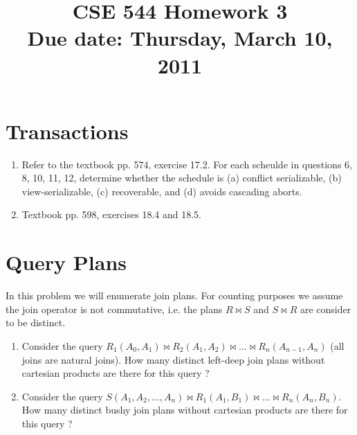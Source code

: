 \documentclass[12pt]{article}
\title{\bf CSE 544 Homework 3 \\
  Due date: Thursday, March 10, 2011}
\author{}
\date{}
\newcounter{query}
\begin{document}

\maketitle



\section{Transactions}

\begin{enumerate}

\item Refer to the textbook pp. 574, exercise 17.2.  For each scheulde
  in questions 6, 8, 10, 11, 12, determine whether the schedule is (a)
  conflict serializable, (b) view-serializable, (c) recoverable, and
  (d) avoids cascading aborts.

\item Textbook pp. 598, exercises 18.4 and 18.5.

\end{enumerate}


\section{Query Plans}

In this problem we will enumerate join plans.  For counting purposes
we assume the join operator is not commutative, i.e. the plans $R
\Join S$ and $S \Join R$ are consider to be distinct.
\begin{enumerate}
\item Consider the query $R_1(A_0,A_1) \Join R_2(A_1,A_2) \Join \ldots
  \Join R_n(A_{n-1},A_n)$ (all joins are natural joins).  How many
  distinct left-deep join plans without cartesian products are there
  for this query ?
\item Consider the query $S(A_1, A_2, \ldots, A_n) \Join R_1(A_1,B_1)
  \Join \ldots \Join R_n(A_n,B_n)$.  How many distinct bushy join
  plans without cartesian products are there for this query ?
  \end{enumerate}
\end{document}
